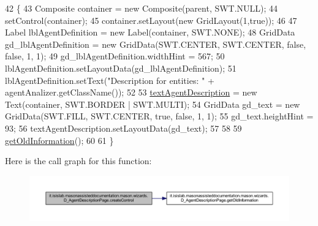 \begin{DoxyCode}
42                                                 \{
43         Composite container = \textcolor{keyword}{new} Composite(parent, SWT.NULL);
44         setControl(container);
45         container.setLayout(\textcolor{keyword}{new} GridLayout(1,\textcolor{keyword}{true}));
46         
47         Label lblAgentDefinition = \textcolor{keyword}{new} Label(container, SWT.NONE);
48         GridData gd\_lblAgentDefinition = \textcolor{keyword}{new} GridData(SWT.CENTER, SWT.CENTER, \textcolor{keyword}{false}, \textcolor{keyword}{false}, 1, 1);
49         gd\_lblAgentDefinition.widthHint = 567;
50         lblAgentDefinition.setLayoutData(gd\_lblAgentDefinition);
51         lblAgentDefinition.setText(\textcolor{stringliteral}{"Description for entities: "} + agentAnalizer.getClassName());
52 
53         \hyperlink{classit_1_1isislab_1_1masonassisteddocumentation_1_1mason_1_1wizards_1_1_d___agent_description_page_a36dfef5219d3c9d56facf7345020ee82}{textAgentDescription} = \textcolor{keyword}{new} Text(container, SWT.BORDER | SWT.MULTI);
54         GridData gd\_text = \textcolor{keyword}{new} GridData(SWT.FILL, SWT.CENTER, \textcolor{keyword}{true}, \textcolor{keyword}{false}, 1, 1);
55         gd\_text.heightHint = 93;
56         textAgentDescription.setLayoutData(gd\_text);
57 
58         
59         \hyperlink{classit_1_1isislab_1_1masonassisteddocumentation_1_1mason_1_1wizards_1_1_d___agent_description_page_a0a7d91afd5148a932706e2b5c5a97b9f}{getOldInformation}();
60         
61     \}
\end{DoxyCode}


Here is the call graph for this function\-:
\nopagebreak
\begin{figure}[H]
\begin{center}
\leavevmode
\includegraphics[width=350pt]{classit_1_1isislab_1_1masonassisteddocumentation_1_1mason_1_1wizards_1_1_d___agent_description_page_aff878d7cd601edf044658e6a06b389db_cgraph}
\end{center}
\end{figure}


